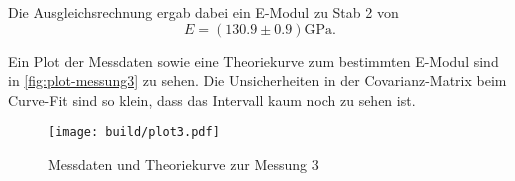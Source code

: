 Die Ausgleichsrechnung ergab dabei ein E-Modul zu Stab 2 von
\begin{equation}
	E = (130.9 \pm 0.9) \si{\giga\pascal}.
	\label{eqn:E-messung3}
\end{equation}

Ein Plot der Messdaten sowie eine Theoriekurve zum bestimmten E-Modul sind in 
\autoref{fig:plot-messung3} zu sehen. Die Unsicherheiten in der 
Covarianz-Matrix beim
Curve-Fit sind so klein, dass das Intervall kaum noch zu sehen ist.

\begin{figure}[H]
	\centering
	\texttt{[image: build/plot3.pdf]}
	\caption{Messdaten und Theoriekurve zur Messung 3}
	\label{fig:plot-messung3}
\end{figure}

